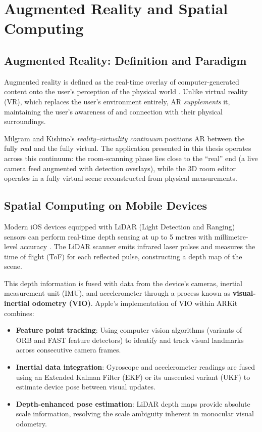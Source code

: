 \section{Augmented Reality and Spatial Computing}
\label{sec:ar_spatial}

\subsection{Augmented Reality: Definition and Paradigm}

Augmented reality is defined as the real-time overlay of computer-generated content onto the user's perception of the physical world \cite{azuma1997}. Unlike virtual reality (VR), which replaces the user's environment entirely, AR \emph{supplements} it, maintaining the user's awareness of and connection with their physical surroundings.

Milgram and Kishino's \emph{reality–virtuality continuum} \cite{milgram1994} positions AR between the fully real and the fully virtual. The application presented in this thesis operates across this continuum: the room-scanning phase lies close to the ``real'' end (a live camera feed augmented with detection overlays), while the 3D room editor operates in a fully virtual scene reconstructed from physical measurements.

\subsection{Spatial Computing on Mobile Devices}

Modern iOS devices equipped with LiDAR (Light Detection and Ranging) sensors can perform real-time depth sensing at up to 5 metres with millimetre-level accuracy \cite{apple_lidar}. The LiDAR scanner emits infrared laser pulses and measures the time of flight (ToF) for each reflected pulse, constructing a depth map of the scene.

This depth information is fused with data from the device's cameras, inertial measurement unit (IMU), and accelerometer through a process known as \textbf{visual-inertial odometry (VIO)}. Apple's implementation of VIO within ARKit combines:

\begin{itemize}
    \item \textbf{Feature point tracking}: Using computer vision algorithms (variants of ORB and FAST feature detectors) to identify and track visual landmarks across consecutive camera frames.
    \item \textbf{Inertial data integration}: Gyroscope and accelerometer readings are fused using an Extended Kalman Filter (EKF) or its unscented variant (UKF) to estimate device pose between visual updates.
    \item \textbf{Depth-enhanced pose estimation}: LiDAR depth maps provide absolute scale information, resolving the scale ambiguity inherent in monocular visual odometry.
\end{itemize}

